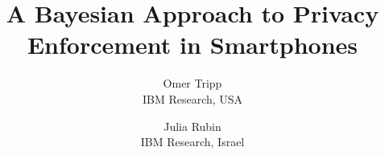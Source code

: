 \documentclass[letterpaper,twocolumn,10pt]{article}
\begin{document}
\date{}


\title{A Bayesian Approach to Privacy Enforcement in Smartphones}
\author{
{\rm Omer Tripp}\\
IBM Research, USA
\and
{\rm Julia Rubin}\\
IBM Research, Israel
} %

\maketitle
















\begin{small}


\end{small}

\balance

\appendix

%

\end{document}
